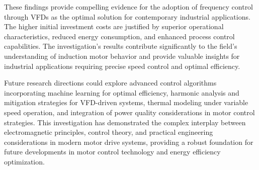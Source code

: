 \documentclass[a4paper,12pt]{article}
\begin{document}
These findings provide compelling evidence for the adoption of frequency control through VFDs as the optimal solution for contemporary industrial applications. The higher initial investment costs are justified by superior operational characteristics, reduced energy consumption, and enhanced process control capabilities. The investigation's results contribute significantly to the field's understanding of induction motor behavior and provide valuable insights for industrial applications requiring precise speed control and optimal efficiency.

Future research directions could explore advanced control algorithms incorporating machine learning for optimal efficiency, harmonic analysis and mitigation strategies for VFD-driven systems, thermal modeling under variable speed operation, and integration of power quality considerations in motor control strategies. This investigation has demonstrated the complex interplay between electromagnetic principles, control theory, and practical engineering considerations in modern motor drive systems, providing a robust foundation for future developments in motor control technology and energy efficiency optimization.
 




  

 
\end{document}
